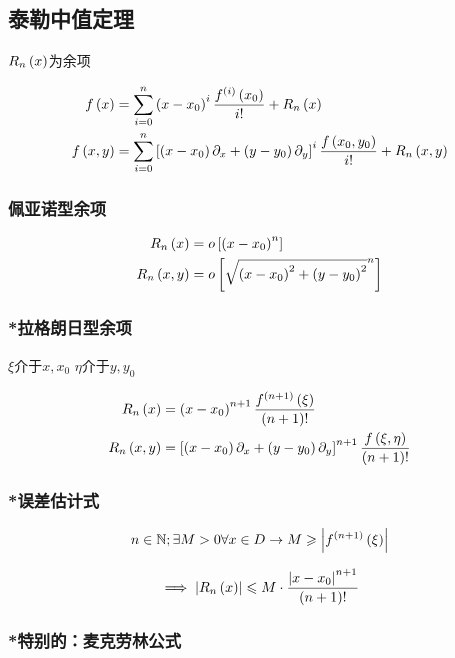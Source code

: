 \documentclass{article}
\begin{document}
\subsection{泰勒中值定理}

$R_n\left(x\right)$为余项

\[\begin{aligned}
        f\left(x\right)   & =\sum_{i=0}^n\left(x-x_0\right)^i\frac{f^{\left(i\right)}\left(x_0\right)}{i!}+R_n\left(x\right)                                           \\
        f\left(x,y\right) & =\sum_{i=0}^n\left[\left(x-x_0\right)\partial_x+\left(y-y_0\right)\partial_y\right]^i\frac{f\left(x_0,y_0\right)}{i!}+R_n\left(x,y\right)\label{2}
    \end{aligned}\]

\subsubsection{佩亚诺型余项}

\[\begin{aligned}
        R_n\left(x\right)   & =
        o\left[\left(x-x_0\right)^n\right] \\
        R_n\left(x,y\right) & =
        o\left[\sqrt{\left(x-x_0\right)^2+\left(y-y_0\right)^2}^n\right]
    \end{aligned}\]

\subsubsection{*拉格朗日型余项\label{Lagrange}}

$\xi$介于$x,x_0$
$\eta$介于$y,y_0$

\[\begin{aligned}
        R_n\left(x\right)   & =
        \left(x-x_0\right)^{n+1}\frac{f^{\left(n+1\right)}\left(\xi\right)}{\left(n+1\right)!} \\
        R_n\left(x,y\right) & =
        \left[\left(x-x_0\right)\partial_x+\left(y-y_0\right)\partial_y\right]^{n+1}\frac{f\left(\xi,\eta\right)}{\left(n+1\right)!}
    \end{aligned}\]

\subsubsection{*误差估计式}

\[n\in\mathbb N;\exists M>0\forall x\in D\to M\geqslant\left|f^{\left(n+1\right)}\left(\xi\right)\right|\]

\[\implies\left|R_n\left(x\right)\right|\leqslant M\cdot\frac{\left|x-x_0\right|^{n+1}}{\left(n+1\right)!}\]

\subsubsection{*特别的：麦克劳林公式}
\end{document}
